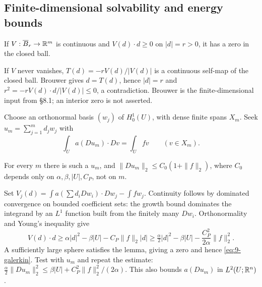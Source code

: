 \subsection{Finite-dimensional solvability and energy bounds}
\Needspace{50mm}
\begin{lemma}
If $V:\overline B_r\to\mathbb{R}^m$ is continuous and $V(d)\cdot d\geq0$
on $|d|=r>0$, it has a zero in the closed ball.
\end{lemma}
\begin{expandedproof}
If $V$ never vanishes, $T(d)=-rV(d)/|V(d)|$ is a continuous self-map
of the closed ball. Brouwer gives $d=T(d)$, hence $|d|=r$ and
$r^2=-rV(d)\cdot d/|V(d)|\leq0$, a contradiction. Brouwer is the
finite-dimensional input from \S8.1; an interior zero is not asserted.
\end{expandedproof}
Choose an orthonormal basis $(w_j)$ of $H^1_0(U)$, with dense finite spans
$X_m$. Seek $u_m=\sum_{j=1}^m d_jw_j$ with
\begin{equation}\label{eq:9-galerkin}
 \int_U a(Du_m)\cdot Dv=\int_Ufv\qquad(v\in X_m).
\end{equation}
\Needspace{50mm}
\begin{theorem}
For every $m$ there is such a $u_m$, and
$\|Du_m\|_2\leq C_0(1+\|f\|_2)$, where $C_0$ depends only on
$\alpha,\beta,|U|,C_P$, not on $m$.
\end{theorem}
\begin{expandedproof}
Set $V_j(d)=\int a(\sum d_iDw_i)\cdot Dw_j-\int fw_j$.
Continuity follows by dominated convergence on bounded coefficient sets:
the growth bound dominates the integrand by an $L^1$ function built from
the finitely many $Dw_i$. Orthonormality and Young's inequality give
\[
 V(d)\cdot d\geq\alpha|d|^2-\beta|U|-C_P\|f\|_2|d|
 \geq\tfrac\alpha2|d|^2-\beta|U|-\frac{C_P^2}{2\alpha}\|f\|_2^2.
\]
A sufficiently large sphere satisfies the lemma, giving a zero and hence
\eqref{eq:9-galerkin}. Test with $u_m$ and repeat the estimate:
$\frac\alpha2\|Du_m\|_2^2\leq\beta|U|+C_P^2\|f\|_2^2/(2\alpha)$.
This also bounds $a(Du_m)$ in $L^2(U;\mathbb{R}^n)$.
\end{expandedproof}
\Needspace{42mm}

\Needspace{70mm}
